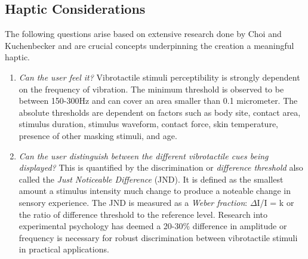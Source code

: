 \subsection{Haptic Considerations}
The following questions arise based on extensive research done by Choi and Kuchenbecker \cite{choi2013vibrotactile} and are crucial concepts underpinning the creation a meaningful haptic.
\begin{enumerate}
    \item \emph{Can the user feel it?}
Vibrotactile stimuli perceptibility is strongly dependent on the frequency of vibration. The minimum threshold is observed to be between 150-300Hz and can cover an area smaller than 0.1 micrometer. The absolute thresholds are dependent on factors such as body site, contact area, stimulus duration, stimulus waveform, contact force, skin temperature, presence of other masking stimuli, and age.

    \item \emph{Can the user distinguish between the different vibrotactile cues being displayed?}
This is quantified by the discrimination or \textit{difference threshold} also called the \textit{Just Noticeable Difference} (JND). It is defined as the smallest amount a stimulus intensity much change to produce a noteable change in sensory experience. The JND is measured as a \textit{Weber fraction}:
${\Delta}$I/I = k or the ratio of difference threshold to the reference level.
Research into experimental psychology has deemed a 20-30\% difference in amplitude or frequency is necessary for robust discrimination between vibrotactile stimuli in practical applications.


\end{enumerate}
